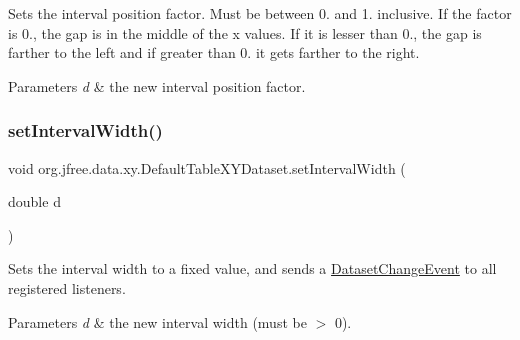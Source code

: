Sets the interval position factor. Must be between 0. and 1. inclusive. If the factor is 0., the gap is in the middle of the x values. If it is lesser than 0., the gap is farther to the left and if greater than 0. it gets farther to the right.


\begin{DoxyParams}{Parameters}
{\em d} & the new interval position factor. \\
\hline
\end{DoxyParams}
\mbox{\label{classorg_1_1jfree_1_1data_1_1xy_1_1_default_table_x_y_dataset_a2ac086d1f957fd64071fd96ee89e9649}} 
\subsubsection{\texorpdfstring{set\+Interval\+Width()}{setIntervalWidth()}}
{\footnotesize\ttfamily void org.\+jfree.\+data.\+xy.\+Default\+Table\+X\+Y\+Dataset.\+set\+Interval\+Width (\begin{DoxyParamCaption}\item[{double}]{d }\end{DoxyParamCaption})}

Sets the interval width to a fixed value, and sends a \mbox{\hyperlink{}{Dataset\+Change\+Event}} to all registered listeners.


\begin{DoxyParams}{Parameters}
{\em d} & the new interval width (must be $>$ 0). \\
\hline
\end{DoxyParams}
\mbox{\label{classorg_1_1jfree_1_1data_1_1xy_1_1_default_table_x_y_dataset_a56df8680d9a9e6642f18b19c4076dfab}} 
